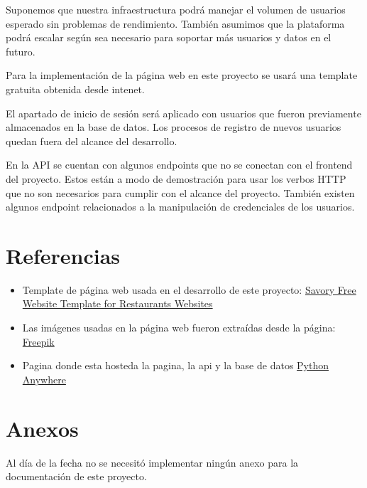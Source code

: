 \documentclass[a4paper,11pt]{article}
\begin{document}
Suponemos que nuestra infraestructura podrá manejar el volumen de usuarios esperado sin problemas de rendimiento. También asumimos que la plataforma podrá escalar según sea necesario para soportar más usuarios y datos en el futuro.

Para la implementación de la página web en este proyecto se usará una template gratuita obtenida desde intenet.

El apartado de inicio de sesión será aplicado con usuarios que fueron previamente almacenados en la base de datos. Los procesos de registro de nuevos usuarios quedan fuera del alcance del desarrollo.

En la API se cuentan con algunos endpoints que no se conectan con el frontend del proyecto. Estos están a modo de demostración para usar los verbos HTTP que no son necesarios para cumplir con el alcance del proyecto. También existen algunos endpoint relacionados a la manipulación de credenciales de los usuarios.
\section*{Referencias}
\begin{itemize}
    \item Template de página web usada en el desarrollo de este proyecto: \href{https://freehtml5.co/savory-free-website-template-for-restaurants-websites/}{Savory Free Website Template for Restaurants Websites}
    \item Las imágenes usadas en la página web fueron extraídas desde la página: \href{https://www.freepik.es}{Freepik}
    \item Pagina donde esta hosteda la pagina, la api y la base de datos \href{https://www.pythonanywhere.com}{Python Anywhere}
\end{itemize}
\section*{Anexos}
Al día de la fecha no se necesitó implementar ningún anexo para la documentación de este proyecto.
\end{document}
